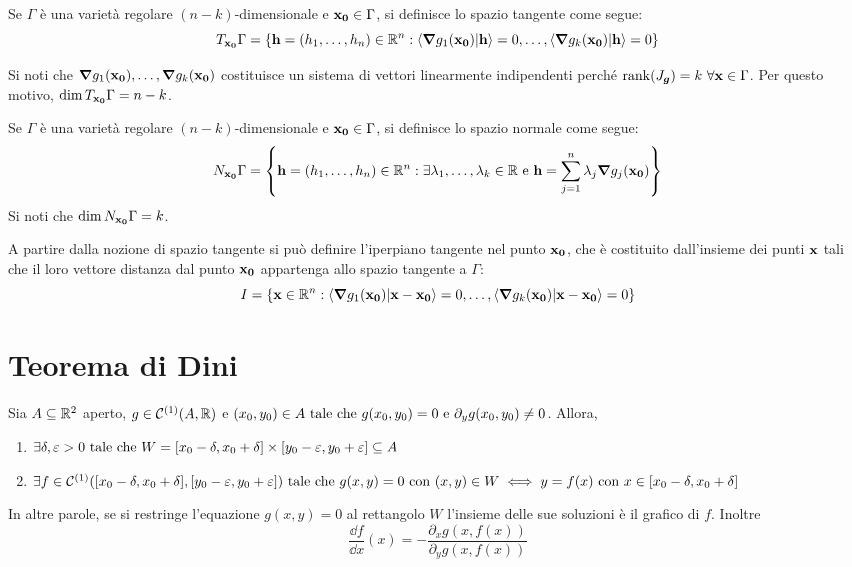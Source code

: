 \begin{definition}
    Se $\Gamma$ è una varietà regolare $(n-k)$-dimensionale e $\vb{x_0} \in \Gamma$, si definisce lo spazio tangente come segue:
    $$
        T_{\vb{x_0}}\Gamma = \{ \vb{h}=(h_1,\dots,h_n) \in \R^n : \ip{\grad g_1(\vb{x_0})}{\vb{h}}=0,\dots,\ip{\grad g_k(\vb{x_0})}{\vb{h}}=0 \}
    $$
\end{definition}

\begin{remark}
    Si noti che $\grad g_1(\vb{x_0}),\dots,\grad g_k (\vb{x_0})$ costituisce un sistema di vettori linearmente indipendenti perché $\rank(J_{\bm g})=k \ \forall \vb{x} \in \Gamma$. Per questo motivo, $\dim T_{\vb{x_0}}\Gamma= n-k$.
\end{remark}

\begin{definition}
    Se $\Gamma$ è una varietà regolare $(n-k)$-dimensionale e $\vb{x_0} \in \Gamma$, si definisce lo spazio normale come segue:
    $$
        N_{\vb{x_0}}\Gamma = \left\{ \vb{h}=(h_1,\dots,h_n) \in \mathbb{R}^n : \exists \lambda_1, \dots, \lambda_k \in \mathbb{R} \text{ e } \vb{h}=\sum_{j=1}^n \lambda_j \grad g_j(\vb{x_0}) \right\}
    $$
    Si noti che $\dim N_{\vb{x_0}}\Gamma = k$.
\end{definition}

\begin{definition}
    A partire dalla nozione di spazio tangente si può definire l'iperpiano tangente nel punto $\vb{x_0}$, che è costituito dall'insieme dei punti $\vb{x}$ tali che il loro vettore distanza dal punto $\vb{x_0}$ appartenga allo spazio tangente a $\Gamma$:
    $$
        I= \{ \vb{x} \in \R^n :  \ip{\grad g_1(\vb{x_0})}{\vb{x}-\vb{x_0}}=0,\dots,\ip{\grad g_k(\vb{x_0})}{\vb{x}-\vb{x_0}}=0 \}
    $$
\end{definition}

\section{Teorema di Dini}

\begin{theorem}
    Sia $A \subseteq \mathbb{R}^2$ aperto, $g \in \mathcal{C}^{(1)}(A, \mathbb{R})$ e $(x_0,y_0) \in A \text{ tale che } g(x_0, y_0)=0 \text{ e } \partial_y g(x_0,y_0)\neq 0$.
    Allora,
    \begin{enumerate}
        \item $\exists \delta, \varepsilon>0 \text{ tale che } W=[x_0-\delta,x_0+\delta]\times[y_0-\varepsilon,y_0+\varepsilon] \subseteq A$
        \item $\exists f \in \mathcal{C}^{(1)}([x_0-\delta,x_0+\delta],[y_0-\varepsilon,y_0+\varepsilon]) \text{ tale che } g(x,y)=0 \text{ con } (x,y) \in W \iff y=f(x) \text{ con } x \in [x_0-\delta,x_0+\delta]$
    \end{enumerate}
    In altre parole, se si restringe l'equazione $g(x,y)=0$ al rettangolo $W$ l'insieme delle sue soluzioni è il grafico di $f$. Inoltre
    $$
        \frac{\dd f}{\dd x}(x)=-\frac{\partial_x g(x,f(x))}{\partial_y g(x,f(x))}
    $$
\end{theorem}

